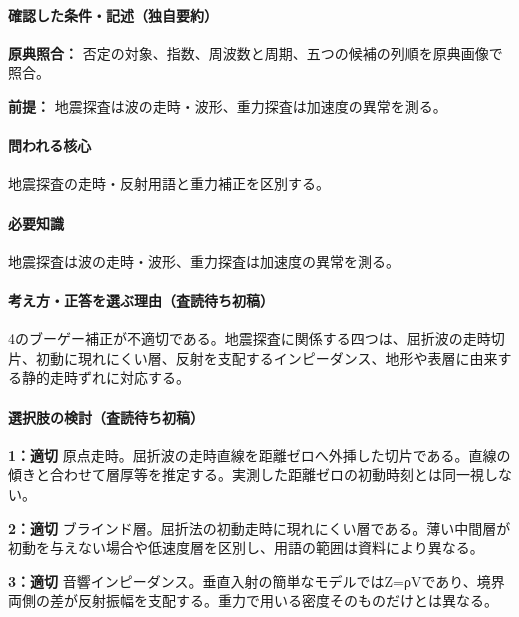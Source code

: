 \paragraph{確認した条件・記述（独自要約）}\mbox{}\par

\noindent\textbf{原典照合：} 否定の対象、指数、周波数と周期、五つの候補の列順を原典画像で照合。\par

\noindent\textbf{前提：} 地震探査は波の走時・波形、重力探査は加速度の異常を測る。\par

\paragraph{問われる核心} 地震探査の走時・反射用語と重力補正を区別する。

\paragraph{必要知識} 地震探査は波の走時・波形、重力探査は加速度の異常を測る。

\paragraph{考え方・正答を選ぶ理由（査読待ち初稿）} 4のブーゲー補正が不適切である。地震探査に関係する四つは、屈折波の走時切片、初動に現れにくい層、反射を支配するインピーダンス、地形や表層に由来する静的走時ずれに対応する。

\paragraph{選択肢の検討（査読待ち初稿）}\mbox{}\par

\noindent\textbf{1：適切} 原点走時。屈折波の走時直線を距離ゼロへ外挿した切片である。直線の傾きと合わせて層厚等を推定する。実測した距離ゼロの初動時刻とは同一視しない。\par

\noindent\textbf{2：適切} ブラインド層。屈折法の初動走時に現れにくい層である。薄い中間層が初動を与えない場合や低速度層を区別し、用語の範囲は資料により異なる。\par

\noindent\textbf{3：適切} 音響インピーダンス。垂直入射の簡単なモデルではZ=ρVであり、境界両側の差が反射振幅を支配する。重力で用いる密度そのものだけとは異なる。\par

